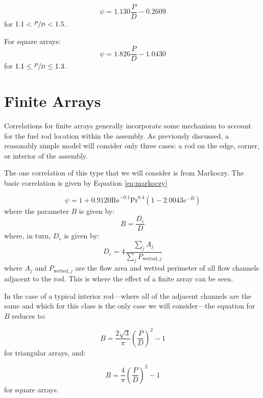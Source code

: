 \begin{equation}
\psi = 1.130 \frac{P}{D} - 0.2609
\end{equation}
for $1.1 < \sfrac{P}{D} < 1.5$.

For square arrays:
\begin{equation}
\psi = 1.826 \frac{P}{D} - 1.0430
\end{equation}
for $1.1 \le \sfrac{P}{D} \le 1.3$.

\section{Finite Arrays}
Correlations for finite arrays generally incorporate some mechanism to account for the fuel rod location within the assembly.  As previously discussed, a reasonably simple model will consider only three cases: a rod on the edge, corner, or interior of the assembly.  

The one correlation of this type that we will consider is from Markoczy.\cite{markoczy1972convective}  The basic correlation is given by Equation \ref{eq:markoczy}

\begin{equation}
\psi = 1 + 0.9120 \text{Re}^{-0.1} \text{Pr}^{0.4} \left(1 - 2.0043 e^{-B} \right)
\label{eq:markoczy}
\end{equation}
where the parameter $B$ is given by:
\begin{equation}
B = \frac{D_e}{D}
\end{equation}
where, in turn, $D_e$ is given by:
\begin{equation}
D_e = 4 \frac{\sum_j A_j}{\sum_j P_{\text{wetted},j}}
\end{equation}
where $A_j$ and $P_{\text{wetted},j}$ are the flow area and wetted perimeter of all flow channels adjacent to the rod.  This is where the effect of a finite array can be seen.

In the case of a typical interior rod---where all of the adjacent channels are the same and which for this class is the only case we will consider---the equation for $B$ reduces to:

\begin{equation}
B = \frac{2 \sqrt{3}}{\pi}\left(\frac{P}{D} \right)^2 - 1
\end{equation}
for triangular arrays, and:

\begin{equation}
B = \frac{4}{\pi}\left(\frac{P}{D} \right)^2 - 1
\end{equation}
for square arrays.

